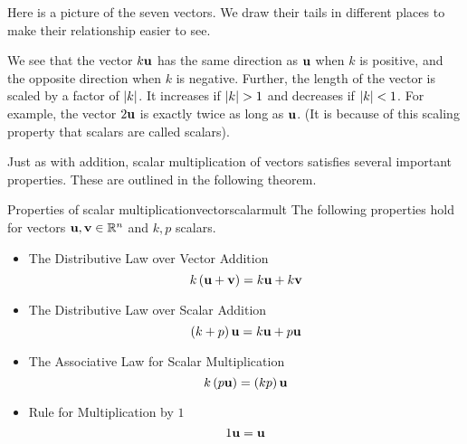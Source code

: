 \begin{solution}
  Here is a picture of the seven vectors. We draw their tails in
  different places to make their relationship easier to see.
  \begin{center}
  \end{center}
  We see that the vector $k\mbox{\bf u}$ has the same direction as
  $\mbox{\bf u}$ when $k$ is positive, and the opposite direction when $k$
  is negative. Further, the length of the vector is scaled by a factor
  of $\left|k\right|$. It increases if $\abs{k}>1$ and decreases if
  $\left|k\right|<1$. For example, the vector $2\mbox{\bf u}$ is exactly twice as
  long as $\mbox{\bf u}$.  (It is because of this scaling property that
  scalars are called scalars).
\end{solution}

Just as with addition, scalar multiplication of vectors satisfies
several important properties. These are outlined in the following
theorem.

\begin{theorem}{Properties of scalar multiplication}{vectorscalarmult}
The following properties hold for vectors $\mbox{\bf u},\mbox{\bf v}\in \mathbb{R}^{n}$ and $k,p $
scalars.
\begin{itemize}
\item The Distributive Law over Vector Addition
\begin{equation*}
k \left(\mbox{\bf u}+\mbox{\bf v}\right) = k\mbox{\bf u}+ k\mbox{\bf v}
\end{equation*}
\item The Distributive Law over Scalar Addition
\begin{equation*}
\left(k + p  \right)\mbox{\bf u} = k \mbox{\bf u}+p \mbox{\bf u}
\end{equation*}
\item The Associative Law for Scalar Multiplication
\begin{equation*}
k \left(p \mbox{\bf u}\right) = \left(k p \right)\mbox{\bf u}
\end{equation*}
\item Rule for Multiplication by $1$
\begin{equation*}
1\mbox{\bf u}=\mbox{\bf u}  
\end{equation*}
\end{itemize}
\end{theorem}

